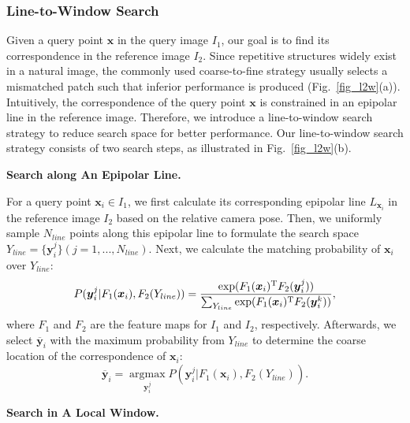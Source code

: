 \documentclass[10pt,twocolumn,letterpaper]{article}
\begin{document}
\subsubsection{Line-to-Window Search}
\label{text_method_desc_l2w}
Given a query point $\boldsymbol {x}$ in the query image $I_1$, our goal is to find its correspondence in the reference image $I_2$. 
Since repetitive structures widely exist in a natural image, the commonly used coarse-to-fine strategy \cite{wangLearningFeatureDescriptors2020, sunLoFTRDetectorFreeLocal2021} usually selects a mismatched patch such that inferior performance is produced (Fig.~\ref{fig_l2w}(a)). 
Intuitively, the correspondence of the query point $\boldsymbol{x}$ is constrained in an epipolar line in the reference image. Therefore, we introduce a line-to-window search strategy to reduce search space for better performance. Our line-to-window search strategy consists of two search steps, as illustrated in Fig.~\ref{fig_l2w}(b).

\noindent \textbf{Search along An Epipolar Line.}

For a query point $ \boldsymbol{x}_i \in I_1$, we first calculate its corresponding epipolar line $L_{\boldsymbol{x}_i}$ in the reference image $I_2$ based on the relative camera pose. Then, we uniformly sample $N_{line}$ points along this epipolar line to formulate the search space $Y_{line}=\{\boldsymbol{y}_i^j\}(j=1,...,N_{line})$.
Next, we calculate the matching probability of $\boldsymbol{x}_i$ over $Y_{line}$:
\begin{equation}
\label{eq_probfunc}
    P({\boldsymbol{y}_i^j}|F_1({\boldsymbol{x}_i}),F_2(Y_{line}))=\frac{\exp (F_1({\boldsymbol{x}_i})^{\rm T}F_2({\boldsymbol{y}_i^j}))}{\sum_{ Y_{line}}\exp (F_1({\boldsymbol{x}_i})^{\rm T}F_2({\boldsymbol{y}_i^k}))},
\end{equation} 
where $F_1$ and $F_2$ are the feature maps for $I_1$ and $I_2$, respectively. Afterwards, we select $\overline{\boldsymbol{y}}_i$ with the maximum probability from $Y_{line}$ to determine the coarse location of the correspondence of $\boldsymbol{x}_i$: 
\begin{equation}
\label{eq_dmfunc}
    \overline{\boldsymbol{y}}_i=\mathop{\arg\max}\limits_{ {\boldsymbol{y}_i^j}}P({\boldsymbol{y}_i^j}|F_1( {\boldsymbol{x}_i}),F_2(Y_{line})).
\end{equation}


\noindent \textbf{Search in A Local Window.}
\end{document}
